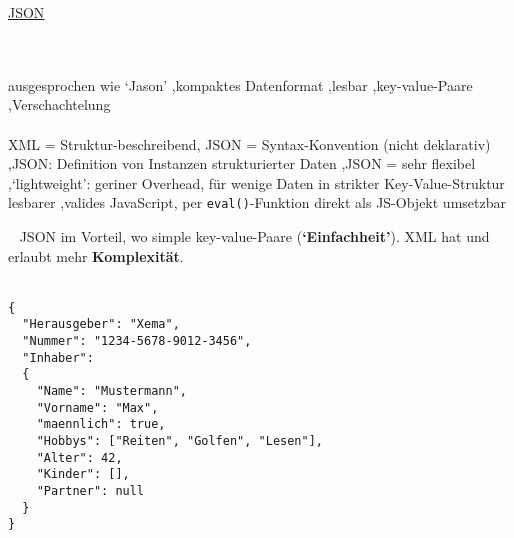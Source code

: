 \begin{frame}{\href{https://de.wikipedia.org/wiki/JavaScript_Object_Notation}{JSON}}

\\
\\
ausgesprochen wie `Jason' \sep kompaktes Datenformat \sep lesbar \sep key-value-Paare \sep Verschachtelung \\

\\
XML = Struktur-beschreibend, JSON = Syntax-Konvention (nicht deklarativ) \sep JSON: Definition von Instanzen strukturierter Daten \sep JSON = sehr flexibel \sep `lightweight': geriner Overhead, für wenige Daten in strikter Key-Value-Struktur lesbarer \sep valides JavaScript, per \verb|eval()|-Funktion direkt als JS-Objekt umsetzbar

~ JSON im Vorteil, wo simple key-value-Paare (\textbf{`Einfachheit'}). XML hat und erlaubt mehr \textbf{Komplexität}.
~\\
~

\footnotesize
\begin{verbatim}
{
  "Herausgeber": "Xema",
  "Nummer": "1234-5678-9012-3456",
  "Inhaber":
  {
    "Name": "Mustermann",
    "Vorname": "Max",
    "maennlich": true,
    "Hobbys": ["Reiten", "Golfen", "Lesen"],
    "Alter": 42,
    "Kinder": [],
    "Partner": null
  }
}
\end{verbatim}\normalsize
\end{frame}


